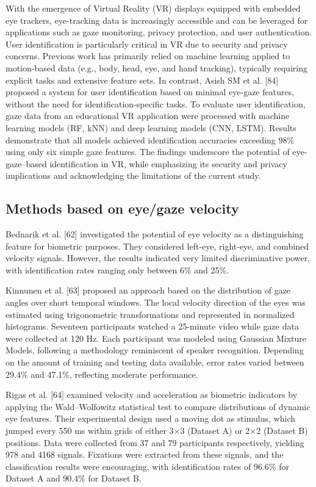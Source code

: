 \documentclass{article}
\begin{document}
With the emergence of Virtual Reality (VR) displays equipped with embedded eye trackers, eye-tracking data is increasingly accessible and can be leveraged for applications such as gaze monitoring, privacy protection, and user authentication.
User identification is particularly critical in VR due to security and privacy concerns. 
Previous work has primarily relied on machine learning applied to motion-based data (e.g., body, head, eye, and hand tracking), typically requiring explicit tasks and extensive feature sets. 
In contrast, Asish SM et al. [84] proposed a system for user identification based on minimal eye-gaze features, without the need for identification-specific tasks. 
To evaluate user identification, gaze data from an educational VR application were processed with machine learning models (RF, kNN) and deep learning models (CNN, LSTM).
Results demonstrate that all models achieved identification accuracies exceeding 98\% using only six simple gaze features. 
The findings underscore the potential of eye-gaze–based identification in VR, while emphasizing its security and privacy implications and acknowledging the limitations of the current study.

\subsection{Methods based on eye/gaze velocity}

Bednarik et al. [62] investigated the potential of eye velocity as a distinguishing feature for biometric purposes.
They considered left-eye, right-eye, and combined velocity signals.
However, the results indicated very limited discriminative power, with identification rates ranging only between 6\% and 25\%.

Kinnunen et al. [63] proposed an approach based on the distribution of gaze angles over short temporal windows. 
The local velocity direction of the eyes was estimated using trigonometric transformations and represented in normalized histograms. 
Seventeen participants watched a 25-minute video while gaze data were collected at 120 Hz. 
Each participant was modeled using Gaussian Mixture Models, following a methodology reminiscent of speaker recognition. 
Depending on the amount of training and testing data available, error rates varied between 29.4\% and 47.1\%, reflecting moderate performance.

Rigas et al. [64] examined velocity and acceleration as biometric indicators by applying the Wald–Wolfowitz statistical test to compare distributions of dynamic eye features.
Their experimental design used a moving dot as stimulus, which jumped every 550 ms within grids of either 3×3 (Dataset A) or 2×2 (Dataset B) positions. 
Data were collected from 37 and 79 participants respectively, yielding 978 and 4168 signals. 
Fixations were extracted from these signals, and the classification results were encouraging, with identification rates of 96.6\% for Dataset A and 90.4\% for Dataset B.
\end{document}
